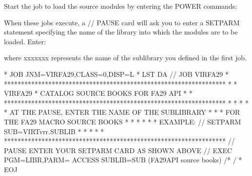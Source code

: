 \documentclass[letterpaper,10pt,english]{sphinxmanual}
\begin{document}

Start the job to load the source modules by entering the POWER commands:

\begin{sphinxVerbatim}[commandchars=\\\{\}]
 
 
 
 
\end{sphinxVerbatim}

When these jobs execute, a // PAUSE card will ask you to enter a SETPARM statement specifying the name of the library into which the modules are to be loaded. Enter:

\begin{sphinxVerbatim}[commandchars=\\\{\}]
  
\end{sphinxVerbatim}

where  xxxxxxx represents the name of the sublibrary you defined in the first job.

\begin{sphinxVerbatim}[commandchars=\\\{\}]
* \PYGZdl{}\PYGZdl{} JOB JNM=VIRFA29,CLASS=0,DISP=L
* \PYGZdl{}\PYGZdl{} LST DA
// JOB VIRFA29
* *****************************************************************
* * VIRFA29 * CATALOG SOURCE BOOKS FOR FA29 API                   *
* *****************************************************************
* *                                                               *
* * AT THE PAUSE, ENTER THE NAME OF THE SUB\PYGZhy{}LIBRARY               *
* * FOR THE FA29 MACRO SOURCE BOOKS                               *
* *                                                               *
* * EXAMPLE: // SETPARM SUB=\PYGZsq{}VIRTvrr.SUBLIB\PYGZsq{}                      *
* *                                                               *
* *****************************************************************
// PAUSE ENTER YOUR SETPARM CARD AS SHOWN ABOVE
// EXEC PGM=LIBR,PARM=\PYGZsq{} ACCESS SUBLIB=\PYGZam{}SUB\PYGZsq{}
        (FA29API source books)
/*
/\PYGZam{}
* \PYGZdl{}\PYGZdl{} EOJ
\end{sphinxVerbatim}

\end{document}
